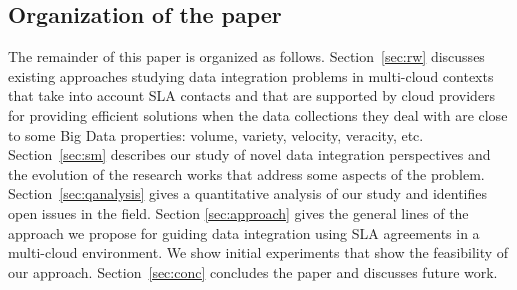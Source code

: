 \subsection{Organization of the paper}
The remainder of this paper is organized as follows. 
Section~\ref{sec:rw} discusses existing approaches studying data integration problems in multi-cloud contexts that take into account SLA contacts and that are supported by cloud providers for providing efficient solutions when the data collections they deal with are close to some Big Data properties: volume, variety, velocity, veracity, etc.
Section~\ref{sec:sm} describes our study of novel data integration perspectives and the evolution of the research works that address some aspects of the problem. Section~\ref{sec:qanalysis} gives a quantitative analysis of our study and identifies open issues in the field. Section \ref{sec:approach} gives the general lines of the approach we propose for guiding data integration using SLA agreements in a multi-cloud environment. We show initial experiments that show the feasibility of our approach.  
Section~\ref{sec:conc} concludes the paper and discusses future work. 


